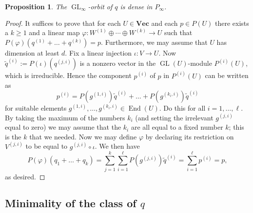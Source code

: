 \documentclass{amsart}
\theoremstyle{plain}
\newtheorem{prop}[thm]{Proposition}
\theoremstyle{definition}
\renewcommand{\phi}{\varphi}
\DeclareMathOperator{\End}{End}
\DeclareMathOperator{\GL}{GL}
\renewcommand{\Vec}{\mathbf{Vec}}
\begin{document}
\begin{prop} \label{prop:Dense}
The $\GL_\infty$-orbit of $q$ is dense in $P_\infty$.
\end{prop}
\begin{proof}
It suffices to prove that for each $U \in \Vec$ and each $p \in P(U)$
there exists a $k\geq 1$ and a linear map $\phi\colon W^{(1)} \oplus \cdots \oplus W^{(k)} \to U$ such that $P(\phi)(q^{(1)} + \ldots + q^{(k)})=p$.  Furthermore, we may
assume that $U$ has dimension at least $d$. Fix a linear
injection $\iota\colon V \to U$. Now $\tilde{q}^{(i)}:=P(\iota)(q^{(j,i)})$ is a nonzero vector in
the $\GL(U)$-module $P^{(i)}(U)$, which
is irreducible. Hence the component $p^{(i)}$ of $p$ in $P^{(i)}(U)$
can be written as
\[
p^{(i)}=P(g^{(1,i)})\tilde{q}^{(i)} + \ldots + P(g^{(k_i,i)})\tilde{q}^{(i)}
\]
for suitable elements $g^{(1,i)},\ldots,g^{(k_i,i)} \in \End(U)$. Do
this for all $i=1,\ldots,\ell$. By taking the maximum of the numbers
$k_i$ (and setting the irrelevant $g^{(j,i)}$ equal to zero) we may
assume that the $k_i$ are all equal to a fixed number
$k$; this is the $k$ that we needed. Now
we may define $\phi$
by declaring its restriction on $V^{(j,i)}$ to be equal to $g^{(j,i)} \circ
\iota$. We then have
\[
P(\phi)(q_1+\ldots+q_k)
= \sum_{j=1}^k \sum_{i=1}^\ell P(g^{(j,i)}) \tilde{q}^{(i)}
= \sum_{i=1}^\ell p^{(i)} = p,
\]
as desired.
\end{proof}

\subsection{Minimality of the class of $q$}
\end{document}
